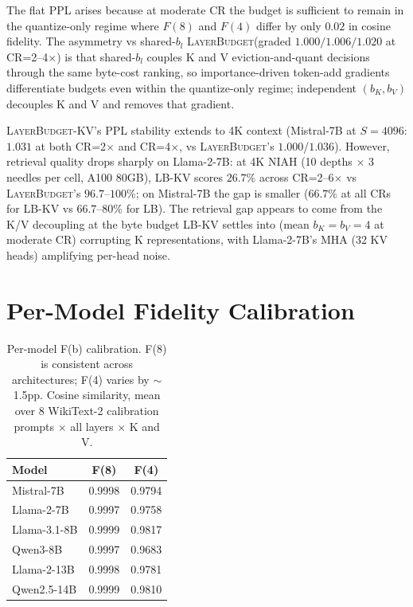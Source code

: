 \documentclass{article}
\newcommand{\layerbudget}{\textsc{LayerBudget}\xspace}
\begin{document}
The flat PPL arises because at moderate CR the budget is sufficient to remain in the quantize-only regime where $F(8)$ and $F(4)$ differ by only $0.02$ in cosine fidelity. The asymmetry vs shared-$b_l$ \layerbudget (graded $1.000/1.006/1.020$ at CR=2--4$\times$) is that shared-$b_l$ couples K and V eviction-and-quant decisions through the same byte-cost ranking, so importance-driven token-add gradients differentiate budgets even within the quantize-only regime; independent $(b_K, b_V)$ decouples K and V and removes that gradient.

\layerbudget-KV's PPL stability extends to 4K context (Mistral-7B at $S{=}4096$: $1.031$ at both CR=2$\times$ and CR=4$\times$, vs \layerbudget's $1.000$/$1.036$). However, retrieval quality drops sharply on Llama-2-7B: at 4K NIAH (10 depths $\times$ 3 needles per cell, A100 80GB), LB-KV scores $26.7\%$ across CR=2--6$\times$ vs \layerbudget's $96.7$--$100\%$; on Mistral-7B the gap is smaller ($66.7\%$ at all CRs for LB-KV vs $66.7$--$80\%$ for LB). The retrieval gap appears to come from the K/V decoupling at the byte budget LB-KV settles into (mean $b_K{=}b_V{=}4$ at moderate CR) corrupting K representations, with Llama-2-7B's MHA (32 KV heads) amplifying per-head noise.

\section{Per-Model Fidelity Calibration}
\label{app:fb-calibration}

\begin{table}[h]
\centering
\caption{Per-model F(b) calibration. F(8) is consistent across architectures; F(4) varies by $\sim$1.5pp.
Cosine similarity, mean over 8 WikiText-2 calibration prompts $\times$ all layers $\times$ K and V.}
\small
\begin{tabular}{@{}lcc@{}}
\toprule
Model & F(8) & F(4) \\
\midrule
Mistral-7B    & 0.9998 & 0.9794 \\
Llama-2-7B    & 0.9997 & 0.9758 \\
Llama-3.1-8B  & 0.9999 & 0.9817 \\
Qwen3-8B      & 0.9997 & 0.9683 \\
Llama-2-13B   & 0.9998 & 0.9781 \\
Qwen2.5-14B   & 0.9999 & 0.9810 \\
\bottomrule
\end{tabular}
\end{table}
\end{document}
